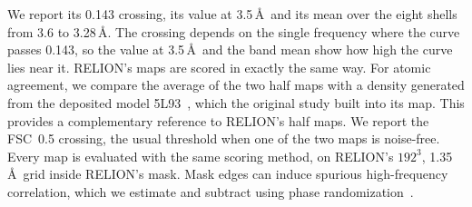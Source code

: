 We report its 0.143 crossing, its value at 3.5\,\AA\ and its mean over the eight shells from 3.6 to 3.28\,\AA.
The crossing depends on the single frequency where the curve passes 0.143, so the value at 3.5\,\AA\ and the band mean show how high the curve lies near it.
RELION's maps are scored in exactly the same way.
For atomic agreement, we compare the average of the two half maps with a density generated from the deposited model 5L93~\cite{schur2016hiv}, which the original study built into its map. This provides a complementary reference to RELION's half maps.
We report the FSC~0.5 crossing, the usual threshold when one of the two maps is noise-free.
Every map is evaluated with the same scoring method, on RELION's $192^3$, 1.35\,\AA\ grid inside RELION's mask.
Mask edges can induce spurious high-frequency correlation, which we estimate and subtract using phase randomization~\cite{chen2013highres}.



